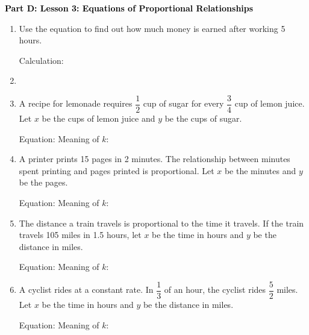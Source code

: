 \documentclass[12pt, letterpaper, fleqn]{article}
\newcommand{\blanklong}{\underline{\hspace{6.5cm}}}
\begin{document}
\newpage

\begin{tcolorbox}[colback=customteal!20]
\large\textcolor{black}{\textbf{Part D: Lesson 3: Equations of Proportional Relationships}}
\end{tcolorbox}

\vspace{3mm}

\begin{enumerate}[itemsep=5.5cm, leftmargin=0.6cm, resume]
\item Use the equation to find out how much money is earned after working 5 hours.
    \begin{tcolorbox}[colback=customteal!10, colframe=customteal!50]
    Calculation: \blanklong
    \end{tcolorbox}
\item [label=\arabic*., itemsep=\fill, leftmargin=0.6cm]
\item A recipe for lemonade requires $\dfrac{1}{2}$ cup of sugar for every $\dfrac{3}{4}$ cup of lemon juice. Let $x$ be the cups of lemon juice and $y$ be the cups of sugar.
    \begin{tcolorbox}[colback=customteal!10, colframe=customteal!50]
    Equation: \blanklong
    Meaning of $k$: \blanklong
    \end{tcolorbox}
\item A printer prints 15 pages in 2 minutes. The relationship between minutes spent printing and pages printed is proportional. Let $x$ be the minutes and $y$ be the pages.
    \begin{tcolorbox}[colback=customteal!10, colframe=customteal!50]
    Equation: \blanklong
    Meaning of $k$: \blanklong
    \end{tcolorbox}
\item The distance a train travels is proportional to the time it travels. If the train travels 105 miles in 1.5 hours, let $x$ be the time in hours and $y$ be the distance in miles.
    \begin{tcolorbox}[colback=customteal!10, colframe=customteal!50]
    Equation: \blanklong
    Meaning of $k$: \blanklong
    \end{tcolorbox}
\item A cyclist rides at a constant rate. In $\dfrac{1}{3}$ of an hour, the cyclist rides $\dfrac{5}{2}$ miles. Let $x$ be the time in hours and $y$ be the distance in miles.
    \begin{tcolorbox}[colback=customteal!10, colframe=customteal!50]
    Equation: \blanklong
    Meaning of $k$: \blanklong
    \end{tcolorbox}
\end{enumerate}
\end{document}
